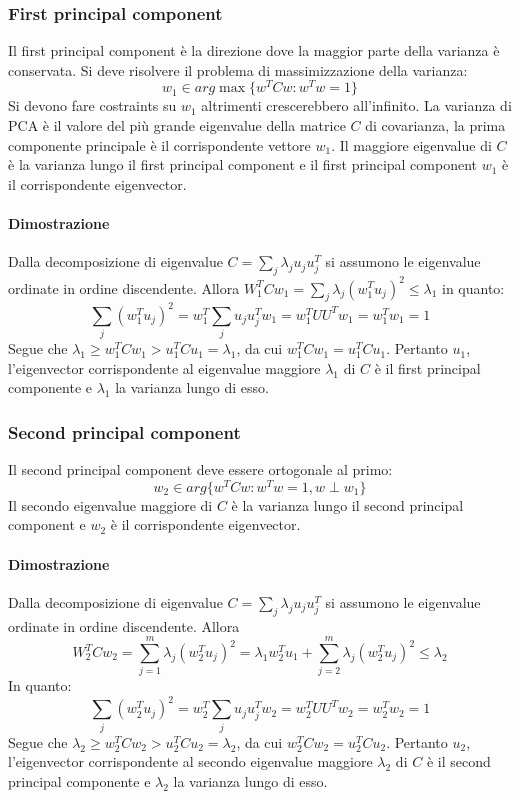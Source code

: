 		\subsubsection{First principal component}
		Il first principal component \`e la direzione dove la maggior parte della varianza \`e conservata.
		Si deve risolvere il problema di massimizzazione della varianza:
		$$w_1\in arg\max\{w^TCw:w^Tw=1\}$$
		Si devono fare costraints su $w_1$ altrimenti crescerebbero all'infinito.
		La varianza di PCA \`e il valore del pi\`u grande eigenvalue della matrice $C$ di covarianza, la prima componente principale \`e il corrispondente vettore $w_1$.
		Il maggiore eigenvalue di $C$ \`e la varianza lungo il first principal component e il first principal component $w_1$ \`e il corrispondente eigenvector.
		
		\paragraph{Dimostrazione}
		Dalla decomposizione di eigenvalue $C=\sum\limits_j\lambda_ju_ju_j^T$ si assumono le eigenvalue ordinate in ordine discendente.
		Allora $W_1^TCw_1 = \sum\limits_j\lambda_j(w_1^Tu_j)^2\le\lambda_1$ in quanto:
		$$\sum\limits_j(w_1^Tu_j)^2 = w_1^T\sum\limits_ju_ju_j^Tw_1=w_1^TUU^Tw_1=w_1^Tw_1=1$$
		Segue che $\lambda_1\ge w_1^TCw_1 >u_1^TCu_1=\lambda_1$, da cui $w_1^TCw_1=u_1^TCu_1$.
		Pertanto $u_1$, l'eigenvector corrispondente al eigenvalue maggiore $\lambda_1$ di $C$ \`e il first principal componente e $\lambda_1$ la varianza lungo di esso.
		
		\subsubsection{Second principal component}
		Il second principal component deve essere ortogonale al primo:
		$$w_2\in arg\{w^TCw:w^Tw=1,w\perp w_1\}$$
		Il secondo eigenvalue maggiore di $C$ \`e la varianza lungo il second principal component e $w_2$ \`e il corrispondente eigenvector.
		
		\paragraph{Dimostrazione}
		
		Dalla decomposizione di eigenvalue $C=\sum\limits_j\lambda_ju_ju_j^T$ si assumono le eigenvalue ordinate in ordine discendente.
		Allora
		$$W_2^TCw_2 = \sum\limits_{j=1}^m\lambda_j(w_2^Tu_j)^2=\lambda_1w_2^Tu_1+\sum\limits_{j=2}^m\lambda_j(w_2^Tu_j)^2\le\lambda_2$$
		In quanto:
		$$\sum\limits_j(w_2^Tu_j)^2 = w_2^T\sum\limits_ju_ju_j^Tw_2=w_2^TUU^Tw_2=w_2^Tw_2=1$$
		Segue che $\lambda_2\ge w_2^TCw_2 >u_2^TCu_2=\lambda_2$, da cui $w_2^TCw_2=u_2^TCu_2$.
		Pertanto $u_2$, l'eigenvector corrispondente al secondo eigenvalue maggiore $\lambda_2$ di $C$ \`e il second principal componente e $\lambda_2$ la varianza lungo di esso.
		

